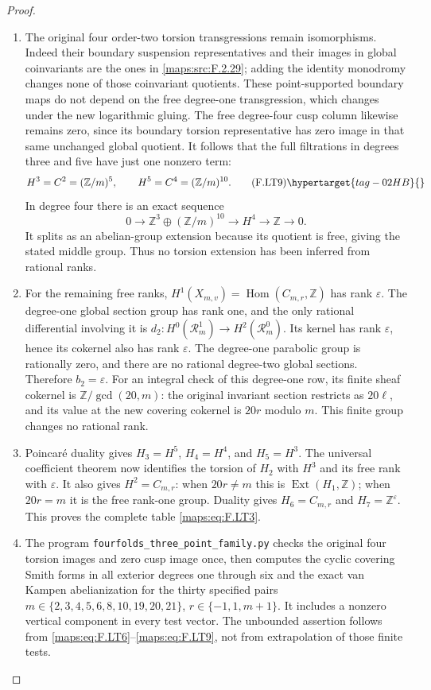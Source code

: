 \begin{proof}
\begin{enumerate}[label={$\langle1\rangle$\arabic*.}]
\item The original four order-two torsion transgressions
remain isomorphisms.
Indeed their boundary suspension representatives and
their images in global coinvariants are the ones in
\ref{maps:src:F.2.29}; adding the identity monodromy changes none
of those coinvariant quotients.
These point-supported boundary maps do not depend
on the free degree-one transgression, which changes
under the new logarithmic gluing.
The free degree-four cusp column likewise remains
zero, since its boundary torsion representative has
zero image in that same unchanged global quotient.
It follows that the full filtrations in degrees
three and five have just one nonzero term:
\[
 H^3=C^2=(\mathbb Z/m)^5,\qquad
 H^5=C^4=(\mathbb Z/m)^{10}.
\tag{F.LT9}\hypertarget{tag-02HB}{}\label{maps:eq:F.LT9}
\]
In degree four there is an exact sequence
\[
 0\longrightarrow
       \mathbb Z^3\oplus(\mathbb Z/m)^{10}
  \longrightarrow H^4
  \longrightarrow\mathbb Z\longrightarrow0.
\]
It splits as an abelian-group extension because
its quotient is free, giving the stated middle group.
Thus no torsion extension has been inferred from
rational ranks.

\item For the remaining free ranks,
$H^1(X_{m,v})=\operatorname{Hom}(C_{m,r},\mathbb Z)$
has rank $\varepsilon$.
The degree-one global section group has rank one,
and the only rational differential involving it is
$d_2:H^0(\mathcal R_m^1)\to H^2(\mathcal R_m^0)$.
Its kernel has rank $\varepsilon$, hence its
cokernel also has rank $\varepsilon$.
The degree-one parabolic group is rationally zero,
and there are no rational degree-two global sections.
Therefore $b_2=\varepsilon$.
For an integral check of this degree-one row, its
finite sheaf cokernel is
$\mathbb Z/\gcd(20,m)$: the original invariant
section restricts as $20\ell$, and its value at
the new covering cokernel is $20r$ modulo $m$.
This finite group changes no rational rank.

\item Poincar\'e duality gives
$H_3=H^5$, $H_4=H^4$, and $H_5=H^3$.
The universal coefficient theorem now identifies
the torsion of $H_2$ with $H^3$ and its free rank
with $\varepsilon$.
It also gives $H^2=C_{m,r}$: when $20r\ne m$ this
is $\operatorname{Ext}(H_1,\mathbb Z)$; when
$20r=m$ it is the free rank-one group.
Duality gives $H_6=C_{m,r}$ and
$H_7=\mathbb Z^\varepsilon$.
This proves the complete table \eqref{maps:eq:F.LT3}.

\item The program \texttt{fourfolds\_three\_point\_family.py}
checks the original four torsion images and zero
cusp image once, then computes the cyclic
covering Smith forms in all exterior degrees one
through six and the exact van Kampen abelianization
for the thirty specified pairs
$m\in\{2,3,4,5,6,8,10,19,20,21\}$,
$r\in\{-1,1,m+1\}$.
It includes a nonzero vertical component in every
test vector.
The unbounded assertion follows from \eqref{maps:eq:F.LT6}--\eqref{maps:eq:F.LT9},
not from extrapolation of those finite tests.

\end{enumerate}
\end{proof}
